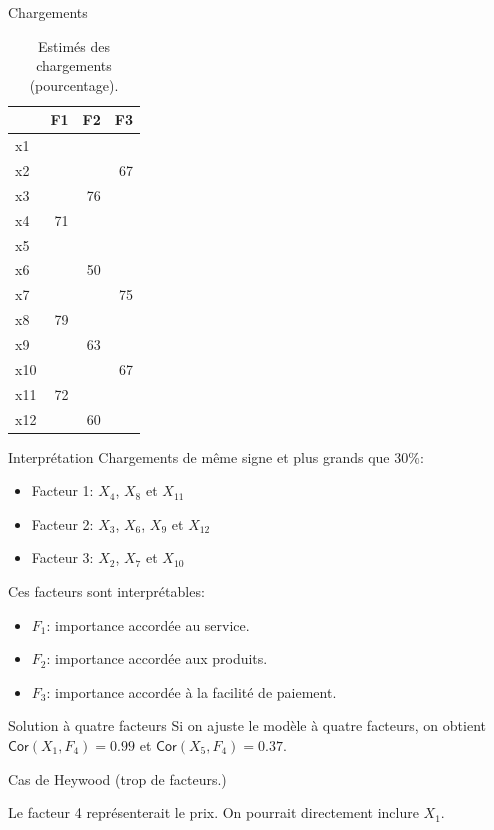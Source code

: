 \documentclass[
  ignorenonframetext,
]{beamer}
\providecommand{\tightlist}{%
  \setlength{\itemsep}{0pt}\setlength{\parskip}{0pt}}\usepackage{longtable,booktabs,array}
\begin{document}
\begin{frame}{Chargements}
\protect\hypertarget{chargements-1}{}
\hypertarget{tbl-factanal3}{}
\begin{table}
\caption{\label{tbl-factanal3}Estimés des chargements (pourcentage). }\tabularnewline

\centering
\begin{tabular}{lrrr}
\toprule
  & F1 & F2 & F3\\
\midrule
x1 &  &  & \\
x2 &  &  & 67\\
x3 &  & 76 & \\
x4 & 71 &  & \\
x5 &  &  & \\
\addlinespace
x6 &  & 50 & \\
x7 &  &  & 75\\
x8 & 79 &  & \\
x9 &  & 63 & \\
x10 &  &  & 67\\
\addlinespace
x11 & 72 &  & \\
x12 &  & 60 & \\
\bottomrule
\end{tabular}
\end{table}
\end{frame}

\begin{frame}{Interprétation}
\protect\hypertarget{interpruxe9tation}{}
Chargements de même signe et plus grands que 30\%:

\begin{itemize}
\tightlist
\item
  Facteur 1: \(X_4\), \(X_8\) et \(X_{11}\)
\item
  Facteur 2: \(X_3\), \(X_6\), \(X_9\) et \(X_{12}\)
\item
  Facteur 3: \(X_2\), \(X_7\) et \(X_{10}\)
\end{itemize}

Ces facteurs sont interprétables:

\begin{itemize}
\tightlist
\item
  \(F_1\): importance accordée au service.
\item
  \(F_2\): importance accordée aux produits.
\item
  \(F_3\): importance accordée à la facilité de paiement.
\end{itemize}
\end{frame}

\begin{frame}{Solution à quatre facteurs}
\protect\hypertarget{solution-uxe0-quatre-facteurs}{}
Si on ajuste le modèle à quatre facteurs, on obtient
\(\mathsf{Cor}(X_1, F_4)=0.99\) et \(\mathsf{Cor}(X_5, F_4)=0.37\).

Cas de Heywood (trop de facteurs.)

Le facteur 4 représenterait le prix. On pourrait directement inclure
\(X_1\).
\end{frame}
\end{document}

